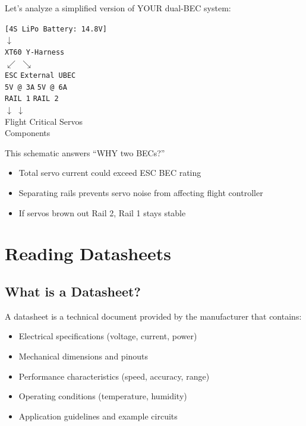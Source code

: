 \documentclass[11pt,letterpaper]{article}
\begin{document}
Let's analyze a simplified version of YOUR dual-BEC system:

\begin{center}
\texttt{[4S LiPo Battery: 14.8V]}\\
$\downarrow$\\
\texttt{XT60 Y-Harness}\\
$\swarrow$ \hspace{3cm} $\searrow$\\
\texttt{ESC} \hspace{3cm} \texttt{External UBEC}\\
\texttt{5V @ 3A} \hspace{2.5cm} \texttt{5V @ 6A}\\
\texttt{RAIL 1} \hspace{2.5cm} \texttt{RAIL 2}\\
$\downarrow$ \hspace{4cm} $\downarrow$\\
Flight Critical \hspace{1.5cm} Servos\\
Components
\end{center}

\begin{keyinsight}
This schematic answers ``WHY two BECs?''
\begin{itemize}
\item Total servo current could exceed ESC BEC rating
\item Separating rails prevents servo noise from affecting flight controller
\item If servos brown out Rail 2, Rail 1 stays stable
\end{itemize}
\end{keyinsight}

\newpage
\section{Reading Datasheets}

\subsection{What is a Datasheet?}

A datasheet is a technical document provided by the manufacturer that contains:
\begin{itemize}
\item Electrical specifications (voltage, current, power)
\item Mechanical dimensions and pinouts
\item Performance characteristics (speed, accuracy, range)
\item Operating conditions (temperature, humidity)
\item Application guidelines and example circuits
\end{itemize}
\end{document}
